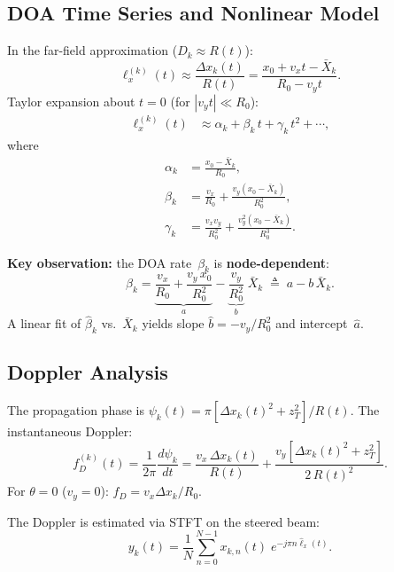 \documentclass[11pt,a4paper]{article}
\begin{document}
\subsection{DOA Time Series and Nonlinear Model}
\label{sec:doa_nonlinear}

In the far-field approximation ($D_k\approx R(t)$):
\begin{equation}
  \ell_x^{(k)}(t) \approx \frac{\Delta x_k(t)}{R(t)}
  = \frac{x_0+v_x t-\bar{X}_k}{R_0-v_y t}.
  \label{eq:doa_ratio}
\end{equation}
Taylor expansion about $t=0$ (for $|v_y t|\ll R_0$):
\begin{align}
  \ell_x^{(k)}(t) &\approx \alpha_k + \beta_k\,t + \gamma_k\,t^2
  + \cdots, \label{eq:doa_taylor}
\end{align}
where
\begin{align}
  \alpha_k &= \frac{x_0{-}\bar{X}_k}{R_0},
  \label{eq:alpha_k}\\
  \beta_k &= \frac{v_x}{R_0}
  + \frac{v_y(x_0{-}\bar{X}_k)}{R_0^2},
  \label{eq:beta_k}\\
  \gamma_k &= \frac{v_x v_y}{R_0^2}
  + \frac{v_y^2(x_0{-}\bar{X}_k)}{R_0^3}.
  \label{eq:gamma_k}
\end{align}

\textbf{Key observation:} the DOA rate~$\beta_k$ is
\textbf{node-dependent}:
\begin{equation}
  \beta_k = \underbrace{\frac{v_x}{R_0}
  + \frac{v_y\,x_0}{R_0^2}}_a
  - \underbrace{\frac{v_y}{R_0^2}}_b\;\bar{X}_k
  \;\triangleq\; a - b\,\bar{X}_k.
  \label{eq:beta_linear_in_Xk}
\end{equation}
A linear fit of $\hat{\beta}_k$ vs.\ $\bar{X}_k$ yields slope
$\hat{b}=-v_y/R_0^2$ and intercept~$\hat{a}$.

\subsection{Doppler Analysis}
\label{sec:doppler}

The propagation phase is
$\psi_k(t)=\pi[\Delta x_k(t)^2+z_T^2]/R(t)$.  The instantaneous
Doppler:
\begin{equation}
  f_D^{(k)}(t) = \frac{1}{2\pi}\frac{d\psi_k}{dt}
  = \frac{v_x\,\Delta x_k(t)}{R(t)}
  + \frac{v_y[\Delta x_k(t)^2+z_T^2]}{2\,R(t)^2}.
  \label{eq:doppler_full}
\end{equation}
For $\theta=0$ ($v_y=0$): $f_D=v_x\Delta x_k/R_0$.

The Doppler is estimated via STFT on the steered beam:
\begin{equation}
  y_k(t) = \frac{1}{N}\sum_{n=0}^{N-1}
  x_{k,n}(t)\;e^{-j\pi n\hat{\ell}_x(t)}.
  \label{eq:steered_beam}
\end{equation}
\end{document}
